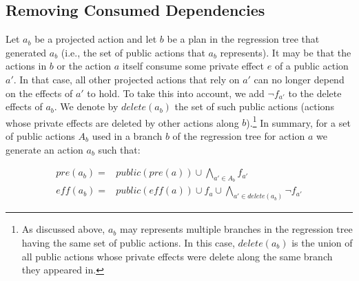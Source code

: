 \documentclass[letterpaper]{article}
\newcommand{\eff}{\textit{eff}}
\newcommand{\pre}{\textit{pre}}
\newcommand{\delete}{\textit{delete}}
\newcommand{\public}{\textit{public}}
\newcommand{\true}{\textit{true}}
\theoremstyle{definition}
\begin{document}




\subsection{Removing Consumed Dependencies}
\label{sec:removingConsumed}
Let $a_b$ be a projected action and let $b$ be a plan in the regression tree that generated $a_b$ (i.e., the set of public actions that $a_b$ represents). It may be that the actions in $b$ or the action $a$ itself consume some private effect $e$ of a public action $a'$. In that case, all other projected actions that rely on $a'$ can no longer depend on the effects of $a'$ to hold. To take this into account, we add $\neg f_{a'}$ to the delete effects of $a_b$. We denote by $\delete (a_b)$ the set of such public actions (actions whose private effects are deleted by other actions along $b$).\footnote{As discussed above, $a_b$ may represents multiple branches in the regression tree having the same set of public actions. In this case, $\delete (a_b)$ is the union of all public actions whose private effects were delete along the same branch they appeared in.} In summary, for a set of public actions $A_b$ used in a branch $b$ of the regression tree for action $a$ we generate an action $a_b$ such that:

\begin{eqnarray}
 \displaystyle  \pre(a_b)=& \public(\pre(a)) \cup \bigwedge_{a'\in A_b} f_{a'} \\
 \displaystyle \eff(a_b)=& \public(\eff(a)) \cup f_{a} \cup \bigwedge_{a'\in \delete(a_b)} \neg f_{a'}
\end{eqnarray}
\end{document}
